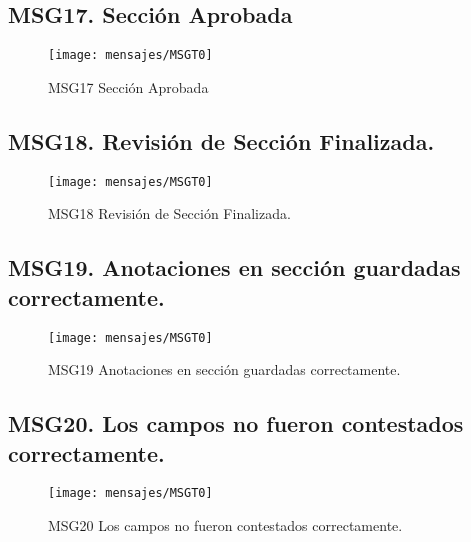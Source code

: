\subsection{MSG17. Sección Aprobada}
    \begin{figure}[htbp]
        \begin{center}
            \texttt{[image: mensajes/MSGT0]}
            \caption{MSG17 Sección Aprobada}
            \label{fig:MSG17}
        \end{center}
    \end{figure}
    

\subsection{MSG18. Revisión de Sección Finalizada.}
    \begin{figure}[htbp]
        \begin{center}
            \texttt{[image: mensajes/MSGT0]}
            \caption{MSG18 Revisión de Sección Finalizada.}
            \label{fig:MSG18}
        \end{center}
    \end{figure}
    
\subsection{MSG19. Anotaciones en sección guardadas correctamente.}
    \begin{figure}[htbp]
        \begin{center}
            \texttt{[image: mensajes/MSGT0]}
            \caption{MSG19 Anotaciones en sección guardadas correctamente.}
            \label{fig:MSG19}
        \end{center}
    \end{figure}

\subsection{MSG20. Los campos no fueron contestados correctamente.}
    \begin{figure}[htbp]
        \begin{center}
            \texttt{[image: mensajes/MSGT0]}
            \caption{MSG20 Los campos no fueron contestados correctamente.}
            \label{fig:MSG20}
        \end{center}
    \end{figure}

